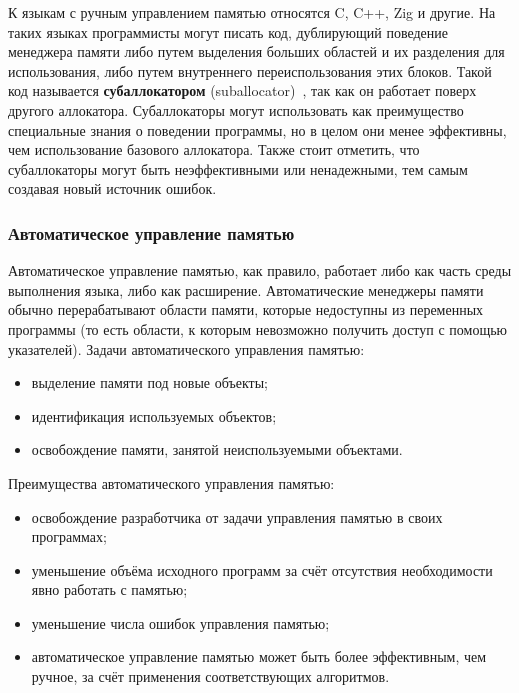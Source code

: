 К языкам с ручным управлением памятью относятся C, C++, Zig и другие. На таких языках программисты могут писать код, дублирующий поведение менеджера памяти либо путем выделения больших областей и их разделения для использования, либо путем внутреннего переиспользования этих блоков. Такой код называется \textbf{субаллокатором} (suballocator)~\cite{glossary}, так как он работает поверх другого аллокатора. Субаллокаторы могут использовать как преимущество специальные знания о поведении программы, но в целом они менее эффективны, чем использование базового аллокатора. Также стоит отметить, что субаллокаторы могут быть неэффективными или ненадежными, тем самым создавая новый источник ошибок.~\cite{allocator}

\subsubsection{Автоматическое управление памятью}

Автоматическое управление памятью, как правило, работает либо как часть среды выполнения языка, либо как расширение. Автоматические менеджеры памяти обычно перерабатывают области памяти, которые недоступны из переменных программы (то есть области, к которым невозможно получить доступ с помощью указателей). Задачи автоматического управления памятью:~\cite{mm_overview}

\begin{itemize}[label*=---]
	\item выделение памяти под новые объекты;
	\item идентификация используемых объектов;
	\item освобождение памяти, занятой неиспользуемыми объектами.
\end{itemize}

Преимущества автоматического управления памятью: 

\begin{itemize}[label*=---]
	\item освобождение разработчика от задачи управления памятью в своих программах;
	\item уменьшение объёма исходного программ за счёт отсутствия необходимости явно работать с памятью;
	\item уменьшение числа ошибок управления памятью;
	\item автоматическое управление памятью может быть более эффективным, чем ручное, за счёт применения соответствующих алгоритмов.
\end{itemize}


